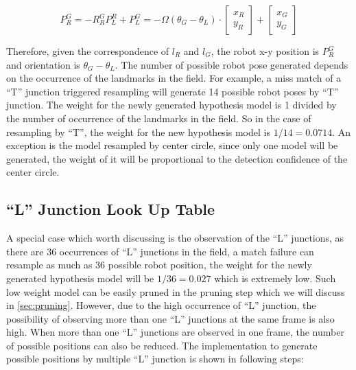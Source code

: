 \begin{equation}
\label{eq:reverseTrans5}
	P_R^G=
	-R_R^G P_L^R +  P_L^G=
   -\Omega(\theta_{G} - \theta_{L}) \cdot
\begin{bmatrix}
  x_R\\
  y_R
\end{bmatrix}
+
\begin{bmatrix}
  x_G\\
  y_G
\end{bmatrix}
\end{equation}

Therefore, given the correspondence of $l_R$ and $l_G$,  the robot x-y position is $P_R^G$ and orientation is $\theta_{G} - \theta_{L}$. The number of possible robot pose generated depends on the occurrence of the landmarks in the field. For example, a miss match of a ``T'' junction triggered resampling will generate 14 possible robot poses by ``T'' junction. The weight for the newly generated hypothesis model is 1 divided by the number of occurrence of the landmarks in the field. So in the case of resampling by ``T'', the weight for the new hypothesis model is $1/14 = 0.0714$. An exception is the model resampled by center circle, since only one model will be generated, the weight of it will be proportional to the detection confidence of the center circle.

\subsection{``L'' Junction Look Up Table}
\label{sub:Junction Look Up Table}
A special case which worth discussing is the observation of the ``L'' junctions, as there are 36 occurrences of ``L'' junctions in the field, a match failure can resample as much as 36 possible robot position, the weight for the newly generated hypothesis model will be $1/36=0.027$ which is extremely low. Such low weight model can be easily pruned in the pruning step which we will discuss in \autoref{sec:pruning}. However, due to the high occurrence of ``L'' junction, the possibility of observing more than one ``L'' junctions at the same frame is also high. When more than one ``L'' junctions are observed in one frame, the number of possible positions can also be reduced. The implementation to generate possible positions by multiple ``L'' junction is shown in following steps:

